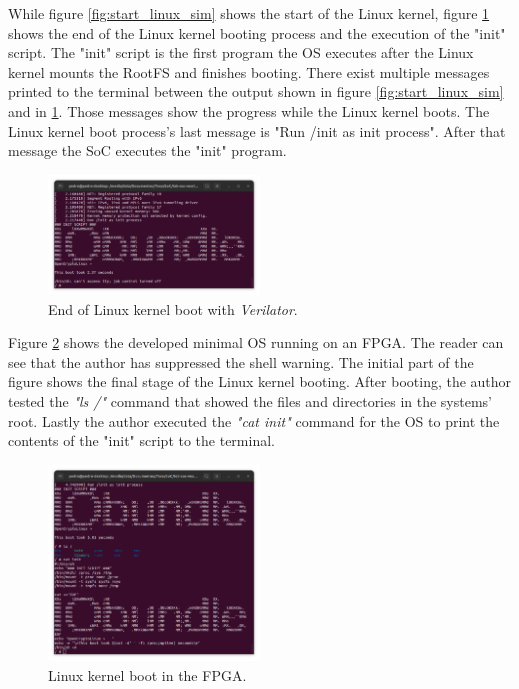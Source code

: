 While figure \ref{fig:start_linux_sim} shows the start of the Linux kernel, figure \ref{fig:end_linux_verilator} shows the end of the Linux kernel booting process and the execution of the "init" script. The "init" script is the first program the OS executes after the Linux kernel mounts the RootFS and finishes booting. There exist multiple messages printed to the terminal between the output shown in figure \ref{fig:start_linux_sim} and in \ref{fig:end_linux_verilator}. Those messages show the progress while the Linux kernel boots. The Linux kernel boot process's last message is "Run /init as init process". After that message the SoC executes the "init" program.

\begin{figure}[!ht]
    \centering
    \includegraphics[width=0.5\textwidth]{../images/end_Linux_sim.png}
    \caption{End of Linux kernel boot with \textit{Verilator}.}
    \label{fig:end_linux_verilator}
\end{figure}

Figure \ref{fig:linux_fpga} shows the developed minimal OS running on an FPGA. The reader can see that the author has suppressed the shell warning. The initial part of the figure shows the final stage of the Linux kernel booting. After booting, the author tested the \textit{"ls /"} command that showed the files and directories in the systems' root. Lastly the author executed the \textit{"cat init"} command for the OS to print the contents of the "init" script to the terminal.

\begin{figure}[!ht]
    \centering
    \includegraphics[width=0.5\textwidth]{../images/linux_fpga.png}
    \caption{Linux kernel boot in the FPGA.}
    \label{fig:linux_fpga}
\end{figure}

